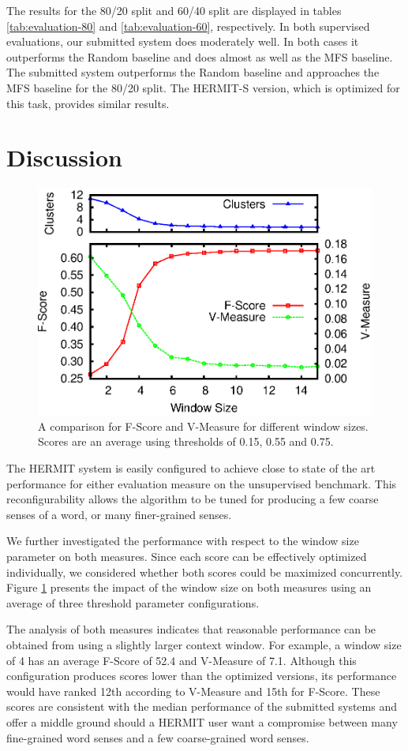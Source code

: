 \documentclass[11pt,a4]{article}
\begin{document}
The results for the 80/20 split and 60/40 split are displayed in tables
\ref{tab:evaluation-80} and \ref{tab:evaluation-60}, respectively.  In both
supervised evaluations, our submitted system does moderately well.  In both
cases it outperforms the Random baseline and does almost as well as the MFS
baseline.  The submitted system outperforms the Random baseline and approaches
the MFS baseline for the 80/20 split. The HERMIT-S version, which is optimized
for this task, provides similar results.

\section{Discussion}
\begin{figure}
  \vspace{-1mm}
  \center \includegraphics[width=.5\textwidth]{figures/hermit-score-comparison.eps}
  \vspace{-10mm}
  \caption{
    A comparison for F-Score and V-Measure for different window sizes.
    Scores are an average using thresholds of 0.15, 0.55 and 0.75.}
  \label{fig:algorithm} 
  \vspace{-1mm}
\end{figure}

The HERMIT system is easily configured to achieve close to state of the art
performance for either evaluation measure on the unsupervised benchmark.  This
reconfigurability allows the algorithm to be tuned for producing a few coarse
senses of a word, or many finer-grained senses.  

We further investigated the performance with respect to the window size
parameter on both measures.  Since each score can be effectively optimized
individually, we considered whether both scores could be maximized concurrently.
Figure \ref{fig:algorithm} presents the impact of the window size on both
measures using an average of three threshold parameter configurations.

The analysis of both measures indicates that reasonable performance can be
obtained from using a slightly larger context window.  For example, a window
size of 4 has an average F-Score of 52.4 and V-Measure of 7.1.  Although this
configuration produces scores lower than the optimized versions, its performance
would have ranked 12th according to V-Measure and 15th for F-Score.  These
scores are consistent with the median performance of the submitted systems and
offer a middle ground should a HERMIT user want a compromise between many
fine-grained word senses and a few coarse-grained word senses.
\end{document}
